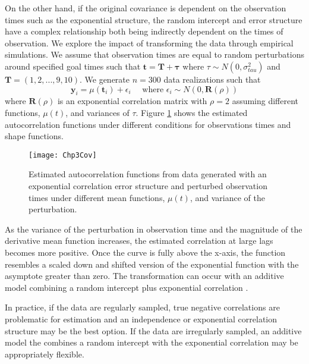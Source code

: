\documentclass[12pt]{article}
\newcommand{\B}[0]{\mathbf}
\begin{document}
On the other hand, if the original covariance is dependent on the observation times such as the exponential structure, the random intercept and error structure have a complex relationship both being indirectly dependent on the times of observation. We explore the impact of transforming the data through empirical simulations. We assume that observation times are equal to random perturbations around specified goal times such that $\B t = \B T + \B \tau$ where $\tau\sim N(0,\sigma^{2}_{tau})$ and $\B T = (1,2,...,9,10)$. We generate $n=300$ data realizations such that
$$\B y_{i} = \mu(\B t_{i}) + \epsilon_{i}\quad\text{ where }\epsilon_{i}\sim N(0,\B R(\rho))$$
where $\B R(\rho)$ is an exponential correlation matrix with $\rho=2$ assuming different functions, $\mu(t)$, and variances of $\tau$. Figure \ref{fig:cov} shows the estimated autocorrelation functions under different conditions for observations times and shape functions.
\begin{figure}
\begin{center}
\texttt{[image: Chp3Cov]}
\end{center}
\caption{Estimated autocorrelation functions from data generated with an exponential correlation error structure and perturbed observation times under different mean functions, $\mu(t)$, and variance of the perturbation.}
\label{fig:cov}
\end{figure}
As the variance of the perturbation in observation time and the magnitude of the derivative mean function increases, the estimated correlation at large lags becomes more positive. Once the curve is fully above the x-axis, the function resembles a scaled down and shifted version of the exponential function with the asymptote greater than zero. The transformation can occur with an additive model combining a random intercept plus exponential correlation  \cite{diggle2002}.

In practice, if the data are regularly sampled, true negative correlations are problematic for estimation and an independence or exponential correlation structure may be the best option. If the data are irregularly sampled, an additive model the combines a random intercept with the exponential correlation may be appropriately flexible. 
\end{document}

